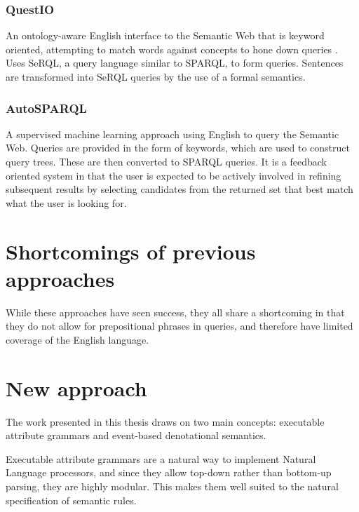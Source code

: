 \documentclass[../main.tex]{subfiles}
\begin{document}
\subsubsection{QuestIO}
An ontology-aware English interface to the Semantic Web that is keyword oriented, attempting to match words against concepts to hone down queries\cite{tablan2008natural} .  Uses SeRQL\cite{serql}, a query language similar to SPARQL, to form queries.  Sentences are transformed into SeRQL queries by the use of a formal semantics.

\subsubsection{AutoSPARQL}
A supervised machine learning approach using English to query the Semantic Web\cite{lehmann2011autosparql}.  Queries are provided in the form of keywords, which are used to construct query trees.  These are then converted to SPARQL queries.  It is a feedback oriented system in that the user is expected to be actively involved in refining subsequent results by selecting candidates from the returned set that best match what the user is looking for.


\section {Shortcomings of previous approaches}

While these approaches have seen success, they all share a shortcoming in that they do not allow for prepositional phrases in queries, and therefore have limited coverage of the English language.

\section {New approach}

The work presented in this thesis draws on two main concepts: executable attribute grammars\cite{frosthafiz2008} and event-based denotational semantics\cite{frostagboola2014}.

Executable attribute grammars are a natural way to implement Natural Language processors\cite{?}, and since they allow top-down rather than bottom-up parsing, they are highly modular\cite{frosthafiz2008}.  This makes them well suited to the natural specification of semantic rules.
\end{document}
